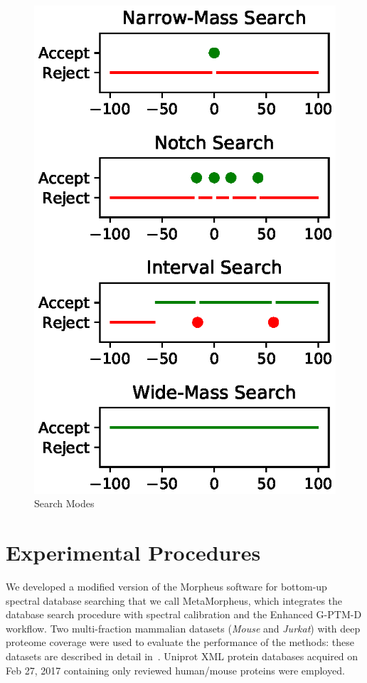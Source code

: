\documentclass[journal=jprobs,manuscript=article]{achemso}
\begin{document}
\begin{figure}
  \includegraphics{figureDifferentSearchModes.eps}
  \caption{Search Modes}
  \label{fgr:differentSearchModes}
\end{figure}

\section{Experimental Procedures}
We developed a modified version of the Morpheus software for bottom-up spectral database searching\cite{Wenger_2013} that we call MetaMorpheus, which integrates the database search procedure with spectral calibration and the Enhanced G-PTM-D workflow. Two multi-fraction mammalian datasets (\textit{Mouse} and \textit{Jurkat}) with deep proteome coverage were used to evaluate the performance of the methods: these datasets are described in detail in~\cite{Shortreed_2015, Cesnik_2016}. Uniprot XML protein databases acquired on Feb 27, 2017 containing only reviewed human/mouse proteins were employed. 
\end{document}
